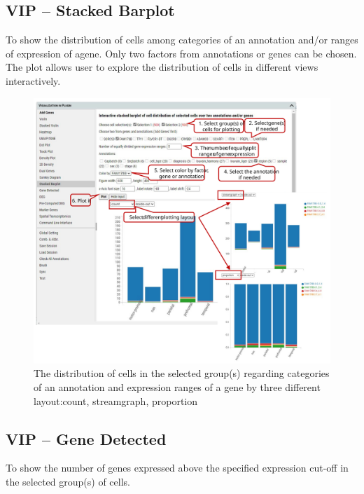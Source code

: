 \documentclass[
]{article}
\begin{document}
\hypertarget{vip-stacked-barplot}{%
\subsection{VIP -- Stacked Barplot}\label{vip-stacked-barplot}}

To show the distribution of cells among categories of an annotation and/or ranges of expression of agene. Only two factors from annotations or genes can be chosen. The plot allows user to explore the distribution of cells in different views interactively.

\begin{figure}
\centering
\includegraphics{figures/F17_label.svg}
\caption{The distribution of cells in the selected group(s) regarding categories of an annotation and expression ranges of a gene by three different layout:count, streamgraph, proportion}
\end{figure}

\hypertarget{vip-gene-detected}{%
\subsection{VIP -- Gene Detected}\label{vip-gene-detected}}

To show the number of genes expressed above the specified expression cut-off in the selected group(s) of cells.
\end{document}
